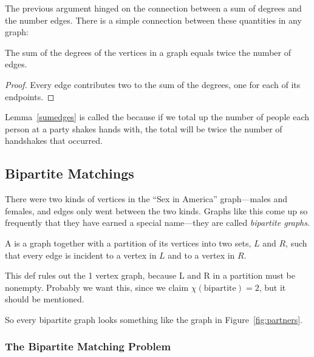 The previous argument hinged on the connection between a sum of
degrees and the number edges.  There is a simple connection between
these quantities in any graph:
\begin{lemma}\label{sumedges}
The sum of the degrees of the vertices in a graph equals twice the
number of edges.
\end{lemma}

\begin{proof}
Every edge contributes two to the sum of the degrees, one for each of
its endpoints.
\end{proof}

Lemma~\ref{sumedges} is called the  because if
we total up the number of people each person at a party shakes hands
with, the total will be twice the number of handshakes that occurred.

\subsection{Bipartite Matchings}\label{bipartitesec}


There were two kinds of vertices in the ``Sex in America''
graph---males and females, and edges only went between the two kinds.
Graphs like this come up so frequently that they have earned a special
name---they are called \emph{bipartite graphs}.

\begin{definition}
A  is a graph together with a partition of its
vertices into two sets, $L$ and $R$, such that every edge is incident to a
vertex in $L$ and to a vertex in $R$.
\end{definition}
\begin{editingnotes}
    This def rules out the 1 vertex
  graph, because L and R in a partition must be nonempty.  Probably we
  want this, since we claim $\chi(\text{bipartite}) = 2$, but it should be
  mentioned.
\end{editingnotes}

So every bipartite graph looks something like the graph in
Figure~\ref{fig:partners}.

\subsubsection{The Bipartite Matching Problem}

